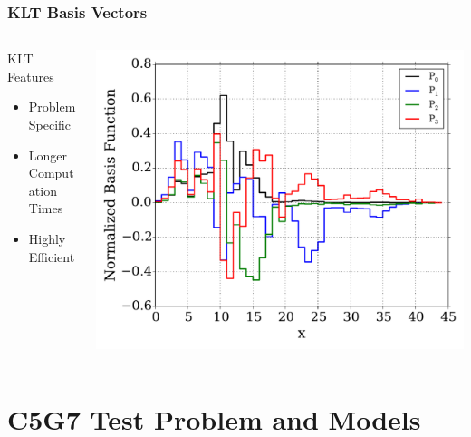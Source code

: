 \documentclass[fleqn]{beamer}
\begin{document}
    \begin{frame}
        \frametitle{KLT Basis Vectors}
        \begin{columns}[T]
            \begin{column}{0.4\textwidth}
                \begin{block}{KLT Features}
                    \begin{itemize}
                        \item Problem Specific
                        \item Longer Computation Times
                        \item Highly Efficient
                    \end{itemize}
                \end{block}
            \end{column}
            \begin{column}{0.6\textwidth}
                \includegraphics[trim=.1cm .25cm .1cm .4cm, clip=true,
                totalheight=0.65\textheight]{Figures/KLT_basis}
            \end{column}
        \end{columns}
    \end{frame}

    \section{C5G7 Test Problem and Models}
\end{document}
